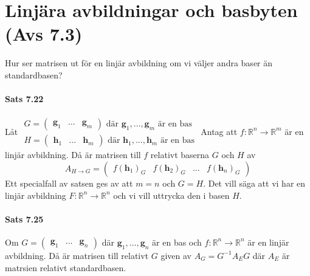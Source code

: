 \section{Linjära avbildningar och basbyten (Avs 7.3)}
Hur ser matrisen ut för en linjär avbildning om vi väljer andra baser än standardbasen?

\paragraph{Sats 7.22} Låt $\begin{matrix}
    G=\begin{pmatrix}\bm{g}_1&\ldots&\bm{g}_m\end{pmatrix}\text{ där }\bm{g}_1,\ldots,\bm{g}_m \text{ är en bas}\\
    H=\begin{pmatrix}\bm{h}_1&\ldots&\bm{h}_m\end{pmatrix}\text{ där }\bm{h}_1,\ldots,\bm{h}_m \text{ är en bas}
\end{matrix}$
Antag att $f:\mathbb{R}^n\rightarrow\mathbb{R}^m$ är en linjär avbildning.
Då är matrisen till $f$ relativt baserna $G$ och $H$ av
\begin{equation*}
    A_{H\rightarrow G}=
    \begin{pmatrix}
        f(\bm{h}_1)_G&f(\bm{h}_2)_G&\ldots&f(\bm{h}_n)_G
    \end{pmatrix}
\end{equation*}
Ett specialfall av satsen ges av att $m=n$ och $G=H$.
Det vill säga att vi har en linjär avbildning $F:\mathbb{R}^n\rightarrow\mathbb{R}^n$ och vi vill uttrycka den i basen $H$.

\paragraph{Sats 7.25} Om $G=\begin{pmatrix}\bm{g}_1&\ldots&\bm{g}_n\end{pmatrix}$ där $\bm{g}_1,\ldots,\bm{g}_n$ är en bas
och $f:\mathbb{R}^n\rightarrow\mathbb{R}^n$ är en linjär avbildning.
Då är matrisen till relativt $G$ given av $A_G=G^{-1}A_EG$ där $A_E$ är matrsien relativt standardbasen.

